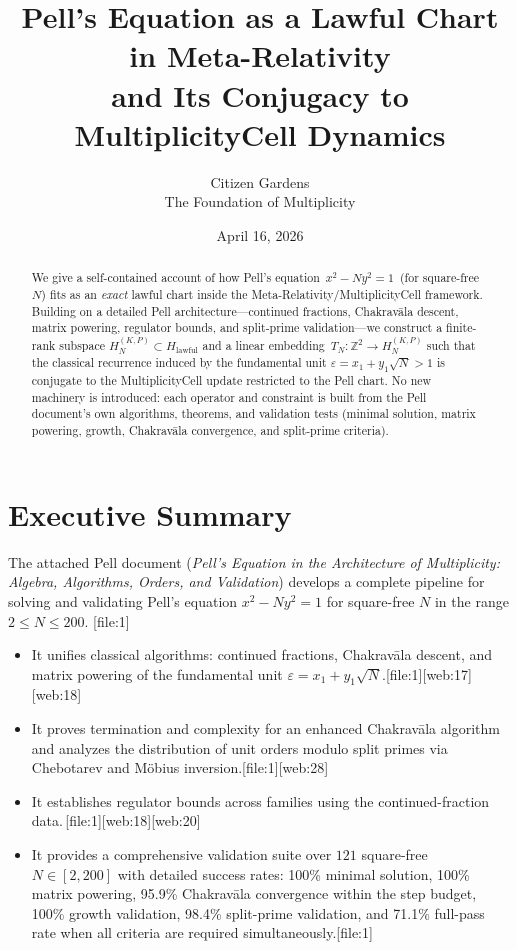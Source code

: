 \documentclass[11pt]{article}
\title{Pell's Equation as a Lawful Chart in Meta-Relativity\\
and Its Conjugacy to MultiplicityCell Dynamics}
\author{%
Citizen Gardens \\ The Foundation of Multiplicity%
}
\date{April 16, 2026}
\begin{document}
\maketitle

\begin{abstract}
We give a self-contained account of how Pell's equation
\(\,x^2 - N y^2 = 1\,\) (for square-free \(N\)) fits as an \emph{exact}
lawful chart inside the Meta-Relativity/Multi\-plicityCell framework.
Building on a detailed Pell architecture---continued fractions,
Chakrav\=ala descent, matrix powering, regulator bounds, and split-prime
validation---we construct a finite-rank subspace
\(H_N^{(K,P)} \subset H_{\text{lawful}}\) and a linear embedding
\(\,T_N: \mathbb{Z}^2 \to H_N^{(K,P)}\) such that the classical
recurrence induced by the fundamental unit
\(\varepsilon = x_1 + y_1\sqrt{N} > 1\) is conjugate to the
MultiplicityCell update restricted to the Pell chart.
No new machinery is introduced: each operator and constraint is built
from the Pell document's own algorithms, theorems, and validation tests
(minimal solution, matrix powering, growth, Chakrav\=ala convergence,
and split-prime criteria).%
\end{abstract}

\tableofcontents

\section{Executive Summary}

The attached Pell document (\emph{Pell's Equation in the Architecture of
Multiplicity: Algebra, Algorithms, Orders, and Validation}) develops a
complete pipeline for solving and validating Pell's equation
\(x^2 - N y^2 = 1\) for square-free \(N\) in the range \(2 \le N \le 200\).%
[file:1]

\begin{itemize}
  \item It unifies classical algorithms: continued fractions, Chakrav\=ala
        descent, and matrix powering of the fundamental unit
        \(\varepsilon = x_1 + y_1\sqrt{N}\).[file:1][web:17][web:18]
  \item It proves termination and complexity for an enhanced Chakrav\=ala
        algorithm and analyzes the distribution of unit orders modulo
        split primes via Chebotarev and M\"obius inversion.[file:1][web:28]
  \item It establishes regulator bounds across families using the
        continued-fraction data.\,[file:1][web:18][web:20]
  \item It provides a comprehensive validation suite over
        \(121\) square-free \(N \in [2,200]\) with detailed success rates:
        100\% minimal solution, 100\% matrix powering, 95.9\% Chakrav\=ala
        convergence within the step budget, 100\% growth validation, 
        98.4\% split-prime validation, and 71.1\% full-pass rate when all
        criteria are required simultaneously.[file:1]
\end{itemize}
\end{document}
